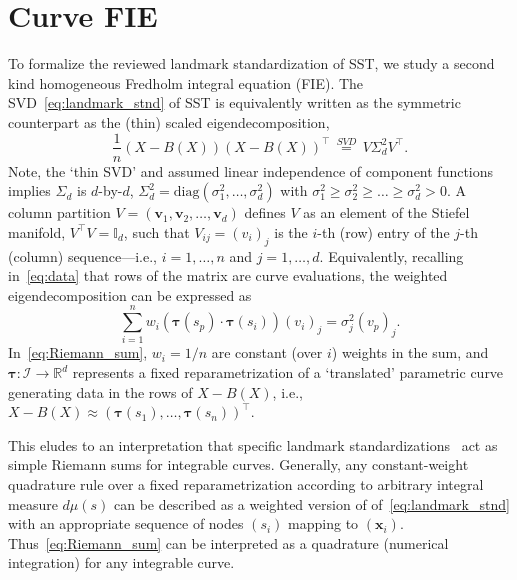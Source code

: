 \documentclass[pdflatex,iicol]{sn-jnl}%
\theoremstyle{thmstyleone}%
\theoremstyle{thmstyletwo}%
\theoremstyle{thmstylethree}%
\begin{document}
\section{Curve FIE} \label{sec:FIE}
To formalize the reviewed landmark standardization of SST, we study a second kind homogeneous Fredholm integral equation (FIE). The SVD~\eqref{eq:landmark_stnd} of SST is equivalently written as the symmetric counterpart as the (thin) scaled eigendecomposition, 
\begin{equation}
    \frac{1}{n}(X - B(X))(X - B(X))^{\top} \,\overset{SVD}{=}\, V\Sigma^2_d V^{\top}.
\end{equation}
Note, the `thin SVD' and assumed linear independence of component functions implies $\Sigma_d$ is $d$-by-$d$, $\Sigma^2_d = \text{diag}(\sigma^2_1,\dots, \sigma^2_d)$ with $\sigma_1^2 \geq \sigma_2^2 \geq \dots \geq \sigma_d^2 > 0$. A column partition $V = (\mathbf{v}_1, \mathbf{v}_2, \dots, \mathbf{v}_d)$ defines $V$ as an element of the Stiefel manifold, $V^{\top}V = \mathbb{I}_d$, such that $V_{ij} = (v_i)_j$ is the $i$-th (row) entry of the $j$-th (column) sequence---i.e., $i=1,\dots,n$ and $j=1,\dots,d$. Equivalently, recalling in~\eqref{eq:data} that rows of the matrix are curve evaluations, the weighted eigendecomposition can be expressed as
\begin{equation} \label{eq:Riemann_sum}
    \sum_{i=1}^{n}w_i ( \boldsymbol{\tau}(s_p) \cdot \boldsymbol{\tau}(s_i) ) (v_i)_j = \sigma^2_j(v_p)_j.
\end{equation}    
In~\eqref{eq:Riemann_sum}, $w_i = 1/n$ are constant (over $i$) weights in the sum, and $\boldsymbol{\tau}:\mathcal{I} \rightarrow \mathbb{R}^d$ represents a fixed reparametrization of a `translated' parametric curve generating data in the rows of $X-B(X)$, i.e., $X-B(X) \approx (\boldsymbol{\tau}(s_1),\dots, \boldsymbol{\tau}(s_n))^{\top}$.

This eludes to an interpretation that specific landmark standardizations~\cite{bryner20142d, grey2023separable} act as simple Riemann sums for integrable curves. Generally, any constant-weight quadrature rule over a fixed reparametrization according to arbitrary integral measure $d\mu(s)$ can be described as a weighted version of of~\eqref{eq:landmark_stnd} with an appropriate sequence of nodes $(s_i)$ mapping to $(\boldsymbol{x}_i)$. Thus~\eqref{eq:Riemann_sum} can be interpreted as a quadrature (numerical integration) for any integrable curve.
\end{document}
